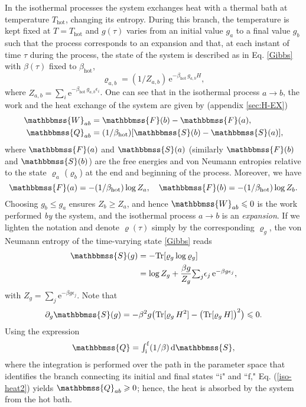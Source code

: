 \documentclass[aps,pra,floatfix,twocolumn,groupedaddress,superscriptaddress,nofootinbib,notitlepage,amsmath,amssymb,]{revtex4-1}
\begin{document}
In the isothermal processes the system exchanges heat with a thermal bath at temperature $T_{\mathrm{hot}}$, changing its entropy. During this branch, the temperature is kept fixed at $T=T_{\mathrm{hot}}$ and $g(\tau)$ varies from an initial value $g_a$ to a final value $g_b$ such that the process corresponds to an expansion and that, at each instant of time $\tau$ during the process, the state of the system is described as in Eq. \eqref{Gibbs} with $\beta(\tau)$ fixed to $\beta_{\mathrm{hot}}$,
\begin{equation}
\label{Gibbsab1}
\varrho_{a,b}=(1/Z_{a,b})\,\mathrm{e}^{-\beta_{\mathrm{hot}}\,g_{a,b} H},
\end{equation}
where $Z_{a,b}=\sum_i\mathrm{e}^{-\beta_{\mathrm{hot}}\,g_{a,b}\epsilon_i}$. One can see that in the isothermal process $a\rightarrow b$, the work and the heat exchange of the system are given by (appendix \ref{sec:H-EX})   
\begin{align}
\label{Work_Iso}
\mathbbmss{W}_{ab}&=\mathbbmss{F}(b)-\mathbbmss{F}(a),\\
\mathbbmss{Q}_{ab}&=(1/\beta_{\mathrm{hot}})[\mathbbmss{S}(b)-\mathbbmss{S}(a)],  
\end{align}
where $\mathbbmss{F}(a)$ and $\mathbbmss{S}(a)$ (similarly $\mathbbmss{F}(b)$ and $\mathbbmss{S}(b)$) are the free energies and von Neumann entropies relative to the state $\varrho_a$ ($\varrho_b$) at the end and beginning of the process. Moreover, we have 
\begin{equation}
\label{procabF}
\mathbbmss{F}(a)=-(1/\beta_{\mathrm{hot}})\log Z_a,\quad \mathbbmss{F}(b)=-(1/\beta_{\mathrm{hot}})\log Z_b.
\end{equation}
Choosing $g_b\leqslant g_a$ ensures $Z_b\geqslant Z_a$, and hence $\mathbbmss{W}_{ab}\leqslant 0$ is the work performed \textit{by} the system, and the isothermal process $a\rightarrow b$ is an \textit{expansion}. If we lighten the notation and denote $\varrho(\tau)$ simply by the corresponding $\varrho_{g}$, the von Neumann entropy of the time-varying state \eqref{Gibbs} reads
\begin{align}
\mathbbmss{S}(g)&=-\mathrm{Tr}[\varrho_g\log\varrho_g]\nonumber\\
&=\log Z_g+\frac{\beta g}{Z_g} \textstyle{\sum_j} \epsilon_j\,\mathrm{e}^{-\beta g\epsilon_j}, \label{iso-heat1}
\end{align}
with $Z_g=\sum_j\mathrm{e}^{-\beta g\epsilon_j}$. Note that 
 \begin{equation}
\label{iso-heat2}
\partial_g \mathbbmss{S}(g)=-\beta^{2}g\big(\mathrm{Tr}[\varrho_g\,H^2]-\big(\mathrm{Tr}[\varrho_{g}\,H]\big)^2\big)\leqslant 0.
\end{equation}
Using the expression  
\begin{equation}
\label{QQ}
\mathbbmss{Q}=\textstyle{\int_{\mathrm{i}}^{\mathrm{f}}} (1/\beta)\, \mathrm{d}\mathbbmss{S},
\end{equation}
where the integration is performed over the path in the parameter space that identifies the branch connecting its initial and final states ``$\mathrm{i}$" and ``$\mathrm{f}$," Eq. (\ref{iso-heat2}) yields $\mathbbmss{Q}_{ab}\geqslant 0$; hence, the heat is absorbed by the system from the hot bath.
\end{document}

